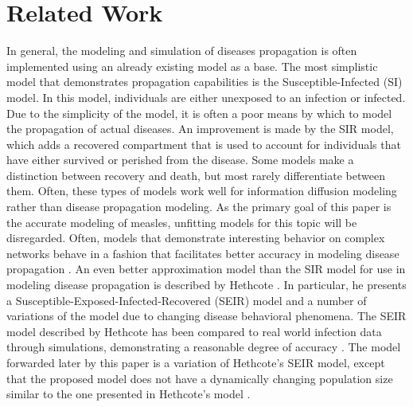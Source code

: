 \documentclass[conference]{IEEEtran}
\begin{document}
\section{Related Work} %
In general, the modeling and simulation of diseases propagation is often implemented using an already existing model as a base. The most simplistic model that demonstrates propagation capabilities is the Susceptible-Infected (SI) model. In this model, individuals are either unexposed to an infection or infected. Due to the simplicity of the model, it is often a poor means by which to model the propagation of actual diseases. An improvement is made by the SIR model, which adds a recovered compartment that is used to account for individuals that have either survived or perished from the disease. Some models make a distinction between recovery and death, but most rarely differentiate between them. Often, these types of models work well for information diffusion modeling \cite{Tambuscio15} rather than disease propagation modeling. As the primary goal of this paper is the accurate modeling of measles, unfitting models for this topic will be disregarded. Often, models that demonstrate interesting behavior on complex networks behave in a fashion that facilitates better accuracy in modeling disease propagation \cite{Hethcote2000TheMO,Pastor_satorras2014}. An even better approximation model than the SIR model for use in modeling disease propagation is described by Hethcote \cite{Hethcote2000TheMO}. In particular, he presents a Susceptible-Exposed-Infected-Recovered (SEIR) model and a number of variations of the model due to changing disease behavioral phenomena. The SEIR model described by Hethcote has been compared to real world infection data through simulations, demonstrating a reasonable degree of accuracy \cite{Montalan19}. The model forwarded later by this paper is a variation of Hethcote's SEIR model, except that the proposed model does not have a dynamically changing population size similar to the one presented in Hethcote's model \cite{Hethcote2000TheMO}.\par
\end{document}
